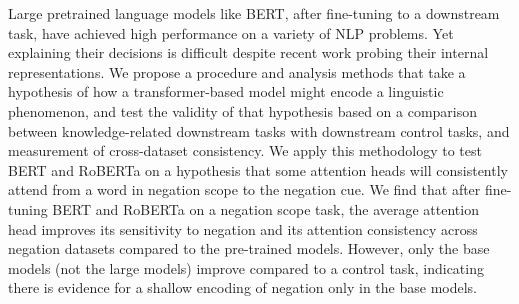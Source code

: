 Large pretrained language models like BERT, after fine-tuning to a downstream task, have achieved high performance on a variety of NLP problems. Yet explaining their decisions is difficult despite recent work probing their internal representations. We propose a procedure and analysis methods that take a hypothesis of how a transformer-based model might encode a linguistic phenomenon, and test the validity of that hypothesis based on a comparison between knowledge-related downstream tasks with downstream control tasks, and measurement of cross-dataset consistency. We apply this methodology to test BERT and RoBERTa on a hypothesis that some attention heads will consistently attend from a word in negation scope to the negation cue. We find that after fine-tuning BERT and RoBERTa on a negation scope task, the average attention head improves its sensitivity to negation and its attention consistency across negation datasets compared to the pre-trained models. However, only the base models (not the large models) improve compared to a control task, indicating there is evidence for a shallow encoding of negation only in the base models.

